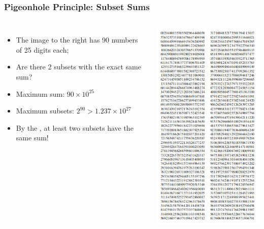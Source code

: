 \documentclass{beamer}
\begin{document}
\begin{frame}
  \frametitle{Pigeonhole Principle: Subset Sums}
  \begin{columns}
    
    {\larger
      \begin{itemize}
      \item The image to the right has 90 numbers of 25 digits each;
      \item Are there 2 subsets with the exact same sum?
        \bigskip

      \item<2> Maximum sum: $90\times10^{25}$
      \item<2> Maximum subsets: $2^{90} > 1.237 \times 10^{27}$
        \bigskip

      \item<2> By the , at least two
        subsets have the same sum!
        
      \end{itemize}
    }
    
    \hspace{-1.3cm}\includegraphics[height=0.8\textheight]{../img/90numbers}
  \end{columns}
\end{frame}
\end{document}
